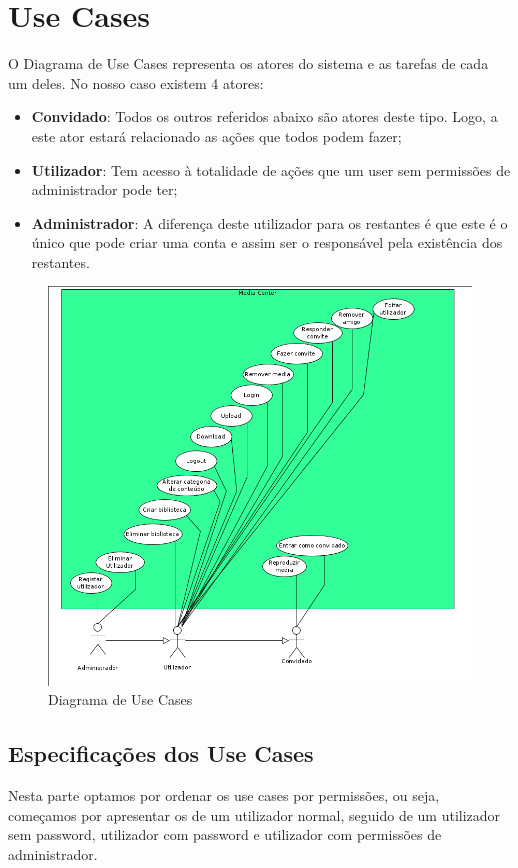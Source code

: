 \documentclass[a4paper]{report}
\begin{document}
\chapter{Use Cases}
O Diagrama de Use Cases representa os atores do sistema e as tarefas de cada um
deles. No nosso caso existem 4 atores:
\begin{itemize}
    \item \textbf{Convidado}: Todos os outros referidos abaixo são atores deste
        tipo. Logo, a este ator estará relacionado as ações que todos podem
        fazer;
    \item \textbf{Utilizador}: Tem acesso à totalidade de ações que um
        user sem permissões de administrador pode ter;
    \item \textbf{Administrador}: A diferença deste 
        utilizador para os restantes é que este é o único que pode criar uma
        conta e assim ser o responsável pela existência dos restantes.
\end{itemize}

\begin{figure}[H]
	\centering 
    \includegraphics[width=\textwidth]{images/UseCases.png}  
    \caption{Diagrama de Use Cases}
\end{figure}

\pagebreak

\section{Especificações dos Use Cases}
Nesta parte optamos por ordenar os use cases por permissões, ou seja, começamos
por apresentar os de um utilizador normal, seguido de um utilizador sem
password, utilizador com password e utilizador com permissões de administrador.
\end{document}
